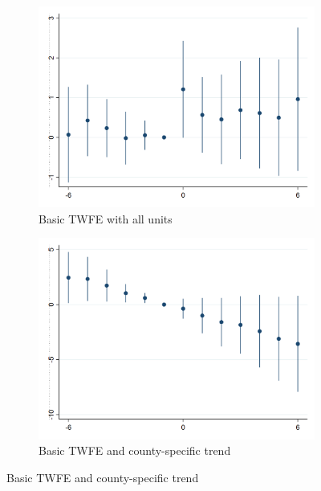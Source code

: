     \begin{figure}[h!] \centering
        \caption{Dynamic effects around selected minimum wage events: housing prices}
        \label{fig:event_study_main}
        \begin{subfigure}{0.5\textwidth} \centering
            \includegraphics[width=0.95\linewidth]{analysis/event_study/output/last_listingpsqft_sfcc_w6.png}
            \caption{Basic TWFE with all units} \label{fig:event_study_treated}
        \end{subfigure}%
        \begin{subfigure}{0.5\textwidth} \centering
            \includegraphics[width=0.95\linewidth]{analysis/event_study/output/last_listingpsqft_sfccw6_county-trend.png}
            \caption{Basic TWFE and county-specific trend} \label{fig:event_study_treated_county-trends}
        \end{subfigure}

\end{figure}

